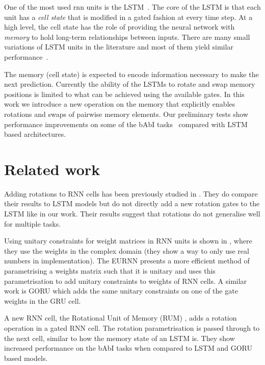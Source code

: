 \documentclass{article}
\begin{document}
One of the most used \ac{rnn} units is the \ac{LSTM}~\citep{hochreiter1997long}. The core of the LSTM is that each unit has a \emph{cell state} that is modified in a gated fashion at every time step. At a high level, the cell state has the role of providing the neural network with \emph{memory} to hold long-term relationships between inputs. There are many small variations of LSTM units in the literature and most of them yield similar performance~\citep{greff2017lstm}.

The memory (cell state) is expected to encode information necessary to make the next prediction. Currently the ability of the \acp{LSTM} to rotate and swap memory positions is limited to what can be achieved using the available gates. In this work we introduce a new operation on the memory that explicitly enables rotations and swaps of pairwise memory elements. Our preliminary tests show performance improvements on some of the bAbI tasks~\citep{DBLP:journals/corr/WestonBCM15} compared with \ac{LSTM} based architectures.

\section{Related work}

Adding rotations to RNN cells has been previously studied in \cite{DBLP:journals/corr/HenaffSL16}. They do compare their results to LSTM models but do not directly add a new rotation gates to the LSTM like in our work. Their results suggest that rotations do not generalise well for multiple tasks.

Using unitary constraints for weight matrices in RNN units is shown in \cite{DBLP:journals/corr/ArjovskySB15}, where they use the weights in the complex domain (they show a way to only use real numbers in implementation). The EURNN \citep{DBLP:conf/icml/JingSDPSLTS17} presents a more efficient method of parametrising a weights matrix such that it is unitary and uses this parametrisation to add unitary constraints to weights of RNN cells. A similar work is GORU \citep{DBLP:journals/corr/JingGPSTSB17} which adds the same unitary constraints on one of the gate weights in the GRU cell.

A new RNN cell, the Rotational Unit of Memory (RUM) \citep{DBLP:journals/corr/abs-1710-09537}, adds a rotation operation in a gated RNN cell. The rotation parametrisation is passed through to the next cell, similar to how the memory state of an LSTM is. They show increased performance on the bAbI tasks when compared to LSTM and GORU based models.
\end{document}
